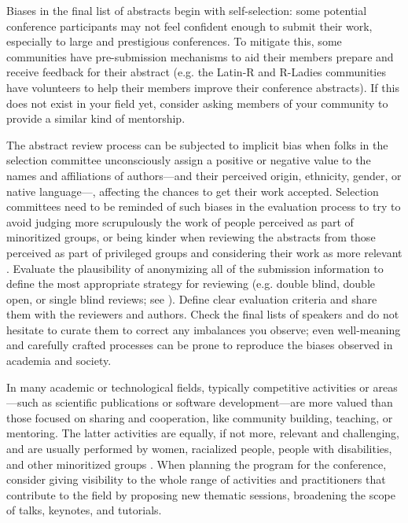 \documentclass[10pt,letterpaper]{article}
\begin{document}
Biases in the final list of abstracts begin with self-selection: some potential conference participants may not feel confident enough to submit their work, especially to large and prestigious conferences.
To mitigate this, 
some communities have pre-submission mechanisms to aid their members prepare and receive feedback for their abstract (e.g. the Latin-R and R-Ladies communities have volunteers to help their members improve their conference abstracts).
If this does not exist in your field yet, consider asking members of your community to provide a similar kind of mentorship.

The abstract review process can be subjected to implicit bias \cite{ross_everyday_2020} when folks in the selection committee unconsciously assign a positive or negative value to the names and affiliations of authors—and their perceived origin, ethnicity, gender, or native language—, affecting the chances to get their work accepted. 
Selection committees need to be reminded of such biases in the evaluation process to try to avoid judging more scrupulously the work of people perceived as part of minoritized groups, or being kinder when reviewing the abstracts from those perceived as part of privileged groups and considering their work as more relevant \cite{swartzScienceValueDiversity2019}.
Evaluate the plausibility of anonymizing all of the submission information to
define the most appropriate strategy for reviewing (e.g. double blind, double open, or single blind reviews; see \cite{numfocus_discover_2021}).
Define clear evaluation criteria and share them with the reviewers and authors.
Check the final lists of speakers and do not hesitate to curate them to correct any imbalances you observe; even well-meaning and carefully crafted processes can be prone to reproduce the biases observed in academia and society.

In many academic or technological fields, typically competitive activities or areas—such as scientific publications or software development—are more valued than those focused on sharing and cooperation, like community building, teaching, or mentoring. 
The latter activities are equally, if not more, relevant and challenging, and are usually performed by women, racialized people, people with disabilities, and other minoritized groups \cite{cheng2020x+, burfordHomelinessMeantHaving2020, light_gender_2022}.
When planning the program for the conference, consider giving visibility to the whole range of activities and practitioners that contribute to the field by proposing new thematic sessions, broadening the scope of talks, keynotes, and tutorials. 
\end{document}
